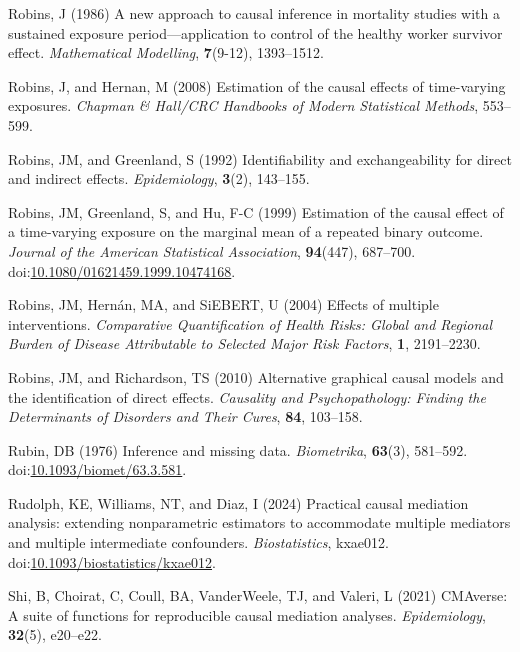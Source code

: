 \documentclass[
  single column]{article}
\newlength{\cslhangindent}
\newenvironment{CSLReferences}[2] %
 {\begin{list}{}{%
  \setlength{\itemindent}{0pt}
  \setlength{\leftmargin}{0pt}
  \setlength{\parsep}{0pt}
  \ifodd #1
   \setlength{\leftmargin}{\cslhangindent}
   \setlength{\itemindent}{-1\cslhangindent}
  \fi
  \setlength{\itemsep}{#2\baselineskip}}}
 {\end{list}}
\begin{document}
\begin{CSLReferences}{1}{0}
Robins, J (1986) A new approach to causal inference in mortality studies
with a sustained exposure period---application to control of the healthy
worker survivor effect. \emph{Mathematical Modelling}, \textbf{7}(9-12),
1393--1512.

Robins, J, and Hernan, M (2008) Estimation of the causal effects of
time-varying exposures. \emph{Chapman \& Hall/CRC Handbooks of Modern
Statistical Methods}, 553--599.

Robins, JM, and Greenland, S (1992) Identifiability and exchangeability
for direct and indirect effects. \emph{Epidemiology}, \textbf{3}(2),
143--155.

Robins, JM, Greenland, S, and Hu, F-C (1999) Estimation of the causal
effect of a time-varying exposure on the marginal mean of a repeated
binary outcome. \emph{Journal of the American Statistical Association},
\textbf{94}(447), 687--700.
doi:\href{https://doi.org/10.1080/01621459.1999.10474168}{10.1080/01621459.1999.10474168}.

Robins, JM, Hernán, MA, and SiEBERT, U (2004) Effects of multiple
interventions. \emph{Comparative Quantification of Health Risks: Global
and Regional Burden of Disease Attributable to Selected Major Risk
Factors}, \textbf{1}, 2191--2230.

Robins, JM, and Richardson, TS (2010) Alternative graphical causal
models and the identification of direct effects. \emph{Causality and
Psychopathology: Finding the Determinants of Disorders and Their Cures},
\textbf{84}, 103--158.

Rubin, DB (1976) Inference and missing data. \emph{Biometrika},
\textbf{63}(3), 581--592.
doi:\href{https://doi.org/10.1093/biomet/63.3.581}{10.1093/biomet/63.3.581}.

Rudolph, KE, Williams, NT, and Diaz, I (2024) {Practical causal
mediation analysis: extending nonparametric estimators to accommodate
multiple mediators and multiple intermediate confounders}.
\emph{Biostatistics}, kxae012.
doi:\href{https://doi.org/10.1093/biostatistics/kxae012}{10.1093/biostatistics/kxae012}.

Shi, B, Choirat, C, Coull, BA, VanderWeele, TJ, and Valeri, L (2021)
CMAverse: A suite of functions for reproducible causal mediation
analyses. \emph{Epidemiology}, \textbf{32}(5), e20--e22.


\end{CSLReferences}
\end{document}
